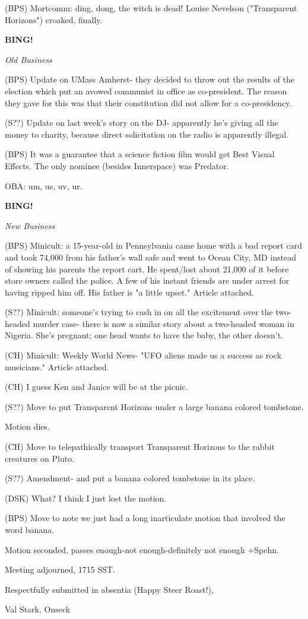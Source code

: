 \documentclass[12pt]{article}
\newcommand{\bing}{{\bf BING!} }
\newcommand{\goto}[1]{\bing \vskip 12pt \centerline{{\em{#1}}}}
\begin{document}
(BPS) Mortcomm: ding, dong, the witch is dead! Louise Nevelson ("Transparent Horizons") croaked, finally.

\goto{Old Business}

(BPS) Update on UMass Amherst- they decided to throw out the results of the election which put an avowed communist in office as co-president. The reason they gave for this was that their constitution did not allow for a co-presidency.

(S??) Update on last week's story on the DJ- apparently he's giving all the money to charity, because direct solicitation on the radio is apparently illegal.

(BPS) It was a guarantee that a science fiction film would get Best Visual Effects. The only nominee (besides Innerspace) was Predator.

OBA: um, us, uv, ur.

\goto{New Business}

(BPS) Minicult: a 15-year-old in Pennsylvania came home with a bad report card and took 74,000 from his father's wall safe and went to Ocean City, MD instead of showing his parents the report cart. He spent/lost about 21,000 of it before store owners called the police. A few of his instant friends are under arrest for having ripped him off. His father is "a little upset." Article attached.

(S??) Minicult: someone's trying to cash in on all the excitement over the two-headed murder case- there is now a similar story about a two-headed woman in Nigeria. She's pregnant; one head wants to have the baby, the other doesn't.

(CH) Minicult: Weekly World News- "UFO aliens made us a success as rock musicians." Article attached.

(CH) I guess Ken and Janice will be at the picnic.

(S??) Move to put Transparent Horizons under a large banana colored tombstone.

Motion dies.

(CH) Move to telepathically transport Transparent Horizons to the rabbit creatures on Pluto.

(S??) Amendment- and put a banana colored tombstone in its place.

(DSK) What? I think I just lost the motion.

(BPS) Move to note we just had a long inarticulate motion that involved the word banana.

Motion seconded, passes enough-not enough-definitely not enough +Spehn.

\vspace{12pt}

\noindent
Meeting adjourned, 1715 SST.

\vspace{18pt}

\centerline{Respectfully submitted in absentia (Happy Steer Roast!),}
\centerline{Val Stark, Onseck}
\end{document}
